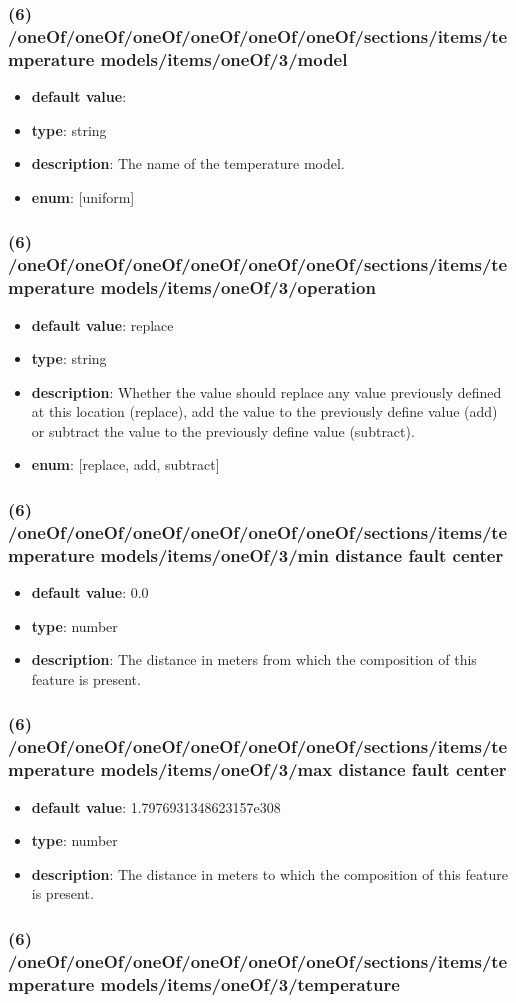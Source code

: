 \subsubsection{(6) /oneOf/oneOf/oneOf/oneOf/oneOf/oneOf/sections/items/temperature models/items/oneOf/3/model}
\begin{itemize}[leftmargin=6em]\item {\bf default value}: 
\item {\bf type}: string
\item {\bf description}: The name of the temperature model.
\item {\bf enum}: [uniform]\end{itemize}\subsubsection{(6) /oneOf/oneOf/oneOf/oneOf/oneOf/oneOf/sections/items/temperature models/items/oneOf/3/operation}
\begin{itemize}[leftmargin=6em]\item {\bf default value}: replace
\item {\bf type}: string
\item {\bf description}: Whether the value should replace any value previously defined at this location (replace), add the value to the previously define value (add) or subtract the value to the previously define value (subtract).
\item {\bf enum}: [replace, add, subtract]\end{itemize}\subsubsection{(6) /oneOf/oneOf/oneOf/oneOf/oneOf/oneOf/sections/items/temperature models/items/oneOf/3/min distance fault center}
\begin{itemize}[leftmargin=6em]\item {\bf default value}: 0.0
\item {\bf type}: number
\item {\bf description}: The distance in meters from which the composition of this feature is present.
\end{itemize}\subsubsection{(6) /oneOf/oneOf/oneOf/oneOf/oneOf/oneOf/sections/items/temperature models/items/oneOf/3/max distance fault center}
\begin{itemize}[leftmargin=6em]\item {\bf default value}: 1.7976931348623157e308
\item {\bf type}: number
\item {\bf description}: The distance in meters to which the composition of this feature is present.
\end{itemize}\subsubsection{(6) /oneOf/oneOf/oneOf/oneOf/oneOf/oneOf/sections/items/temperature models/items/oneOf/3/temperature}
